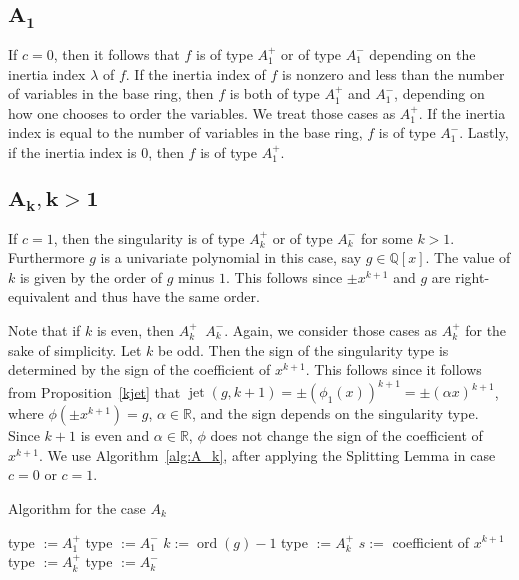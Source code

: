 \documentclass[noend]{amsproc}
\theoremstyle{definition}
\DeclareMathOperator{\ord}{ord}
\DeclareMathOperator{\requiv}{\overset{r}{\sim}}
\DeclareMathOperator{\jet}{jet}
\begin{document}
\subsection{$\boldsymbol{A_1}$}
If $c = 0$, then it follows that $f$ is of type $A_1^+$ or of type $A_1^-$
depending on the inertia index $\lambda$ of $f$. If the inertia index of $f$ is
nonzero and less than the number of variables in the base ring, then $f$ is
both of type $A_1^+$ and $A_1^-$, depending on how one chooses to order the
variables. We treat those cases as $A_1^+$. If the inertia index is equal to
the number of variables in the base ring, $f$ is of type $A_1^-$. Lastly, if
the inertia index is $0$, then $f$ is of type $A_1^+$.

\subsection{$\boldsymbol{A_k, k > 1}$}
If $c=1$, then the singularity is of type $A_k^+$ or of type $A_k^-$ for some
$k>1$. Furthermore $g$ is a univariate polynomial in this case, say
$g\in\mathbb Q[x]$. The value of $k$ is given by the order of $g$ minus $1$.
This follows since $\pm x^{k+1}$ and $g$ are right-equivalent and thus have the
same order.

Note that if $k$ is even, then $A_k^+\requiv A_k^-$. Again, we consider those
cases as $A_k^+$ for the sake of simplicity. Let $k$ be odd. Then the sign of
the singularity type is determined by the sign of the coefficient of $x^{k+1}$.
This follows since it follows from Proposition~\ref{kjet} that
$\jet(g, k+1)=\pm(\phi_1(x))^{k+1}=\pm(\alpha x)^{k+1}$, where
$\phi(\pm x^{k+1})=g$, $\alpha\in\mathbb R$, and the sign depends on the
singularity type. Since $k+1$ is even and $\alpha\in\mathbb R$, $\phi$ does not
change the sign of the coefficient of $x^{k+1}$. We use
Algorithm~\ref{alg:A_k}, after applying the Splitting Lemma in case $c=0$ or
$c=1$.

\begin{algorithm}[ht]
\caption{\label{alg:A_k} Algorithm for the case $A_k$}
\begin{algorithmic}[1]



\STATE type $:=A_1^+$
\ELSE
\STATE type $:=A_1^-$
\ENDIF
\ENDIF
{}
\STATE $k:= \ord(g)-1$
\STATE type $:=A_k^+$
\ELSE
\STATE $s:=$ coefficient of $x^{k+1}$
\STATE type $:=A_k^+$
\ELSE
\STATE type $:=A_k^-$
\ENDIF
\ENDIF
\ENDIF
{}

\end{algorithmic}
\end{algorithm}
\end{document}
